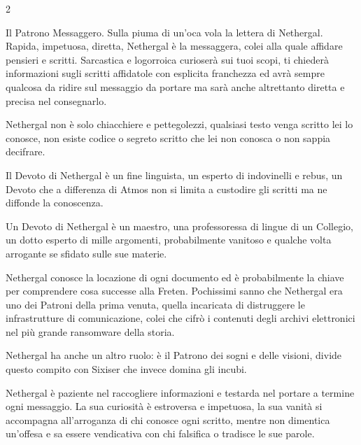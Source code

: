 \begin{multicols}{2}
\medskip

Il Patrono Messaggero. Sulla piuma di un'oca vola la lettera di Nethergal. Rapida, impetuosa, diretta, Nethergal è la messaggera, colei alla quale affidare pensieri e scritti. Sarcastica e logorroica curioserà sui tuoi scopi, ti chiederà informazioni sugli scritti affidatole con esplicita franchezza ed avrà sempre qualcosa da ridire sul messaggio da portare ma sarà anche altrettanto diretta e precisa nel consegnarlo.

Nethergal non è solo chiacchiere e pettegolezzi, qualsiasi testo venga scritto lei lo conosce, non esiste codice o segreto scritto che lei non conosca o non sappia decifrare.

Il Devoto di Nethergal è un fine linguista, un esperto di indovinelli e rebus, un Devoto che a differenza di Atmos non si limita a custodire gli scritti ma ne diffonde la conoscenza.

Un Devoto di Nethergal è un maestro, una professoressa di lingue di un Collegio, un dotto esperto di mille argomenti, probabilmente vanitoso e qualche volta arrogante se sfidato sulle sue materie.

Nethergal conosce la locazione di ogni documento ed è probabilmente la chiave per comprendere cosa successe alla Freten. Pochissimi sanno che Nethergal era uno dei Patroni della prima venuta, quella incaricata di distruggere le infrastrutture di comunicazione, colei che cifrò i contenuti degli archivi elettronici nel più grande ransomware della storia.

Nethergal ha anche un altro ruolo: è il Patrono dei sogni e delle visioni, divide questo compito con Sixiser che invece domina gli incubi.

Nethergal è paziente nel raccogliere informazioni e testarda nel portare a termine ogni messaggio. La sua curiosità è estroversa e impetuosa, la sua vanità si accompagna all'arroganza di chi conosce ogni scritto, mentre non dimentica un'offesa e sa essere vendicativa con chi falsifica o tradisce le sue parole.


\end{multicols}
